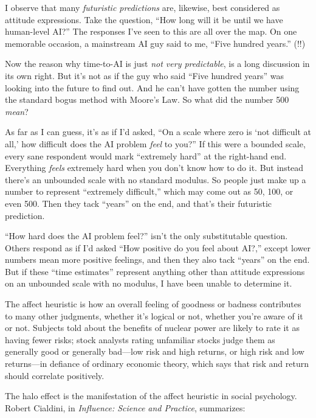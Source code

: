 {
 I observe that many \textit{futuristic predictions} are, likewise,
best considered as attitude expressions. Take the question,
``How long will it be until we have human-level
AI?'' The responses I've seen to this
are all over the map. On one memorable occasion, a mainstream AI guy
said to me, ``Five hundred years.''
(!!)}

{
 Now the reason why time-to-AI is just \textit{not very
predictable}, is a long discussion in its own right. But
it's not as if the guy who said ``Five
hundred years'' was looking into the future to find
out. And he can't have gotten the number using the
standard bogus method with Moore's Law. So what did the
number 500 \textit{mean}?}

{
 As far as I can guess, it's as if
I'd asked, ``On a scale where zero is
`not difficult at all,' how difficult
does the AI problem \textit{feel} to you?'' If this
were a bounded scale, every sane respondent would mark
``extremely hard'' at the right-hand
end. Everything \textit{feels} extremely hard when you
don't know how to do it. But instead
there's an unbounded scale with no standard modulus. So
people just make up a number to represent ``extremely
difficult,'' which may come out as 50, 100, or even
500. Then they tack ``years'' on the
end, and that's their futuristic prediction.}

{
 ``How hard does the AI problem
feel?'' isn't the only substitutable
question. Others respond as if I'd asked
``How positive do you feel about
AI?,'' except lower numbers mean more positive
feelings, and then they also tack
``years'' on the end. But if these
``time estimates'' represent
anything other than attitude expressions on an unbounded scale with no
modulus, I have been unable to determine it.}

\myendsectiontext


\bigskip


{
 The affect heuristic is how an overall feeling of goodness or
badness contributes to many other judgments, whether
it's logical or not, whether you're
aware of it or not. Subjects told about the benefits of nuclear power
are likely to rate it as having fewer risks; stock analysts rating
unfamiliar stocks judge them as generally good or generally bad---low
risk and high returns, or high risk and low returns---in defiance of
ordinary economic theory, which says that risk and return should
correlate positively. }

{
 The halo effect is the manifestation of the affect heuristic in
social psychology. Robert Cialdini, in \textit{Influence: Science and
Practice}, summarizes:}

